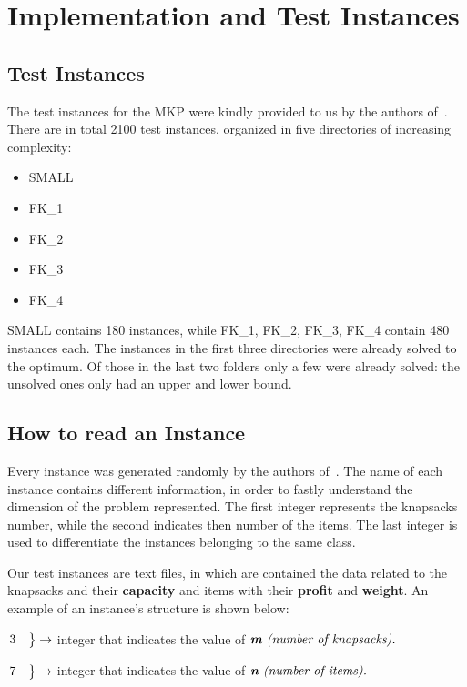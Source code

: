\chapter{Implementation and Test Instances}

\section{Test Instances}
The test instances for the MKP were kindly provided to us by the authors of~\cite{mkp:2019}.\\
There are in total 2100 test instances, organized in
five directories of increasing complexity:
\begin{itemize}
    \item SMALL
    \item FK\_1
    \item FK\_2
    \item FK\_3
    \item FK\_4
\end{itemize}
SMALL contains 180 instances, while FK\_1, FK\_2, FK\_3, FK\_4 contain 480 instances each.
The instances in the first three directories were already solved to the optimum.
Of those in the last two folders only a few were already solved: the unsolved
ones only had an upper and lower bound.
\newpage
\section{How to read an Instance}
Every instance was generated randomly by the authors of~\cite{mkp:2019}.
The name of each instance contains different information, in order to fastly understand the dimension of the problem represented.
The first integer represents the knapsacks number, while the second indicates then number of the items.
The last integer is used to differentiate the instances belonging to the same class.


Our test instances are text files, in which are contained the data related to the knapsacks and their \textbf{capacity} and items with their \textbf{profit} and \textbf{weight}. An example of an instance's structure is shown below:

	\begin{flushleft} 
		$\begin{rcases*}
			3 \quad
		\end{rcases*} \rightarrow $ integer that indicates the value of $ \textit{\textbf{m} (number of knapsacks).}$
	\end{flushleft}
	\begin{flushleft}
		$\begin{rcases*}
			7 \quad
		\end{rcases*} \rightarrow $ integer that indicates the value of $ \textit{\textbf{n} (number of items).}$
	\end{flushleft}

